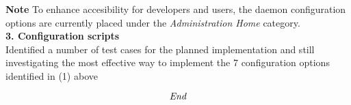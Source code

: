 \documentclass[10pt, a4]{article}
\begin{document}
\noindent \textbf{\normalsize Note} To enhance accesibility for developers and users, 
the daemon configuration options are currently placed under the \emph{Administration Home} category.\\

\noindent \textbf{\normalsize 3. Configuration scripts}\\
Identified a number of test cases for the planned implementation and still investigating the 
most effective way to implement the 7 configuration options identified in (1) above


\[\emph{End}\]
 
\end{document}
